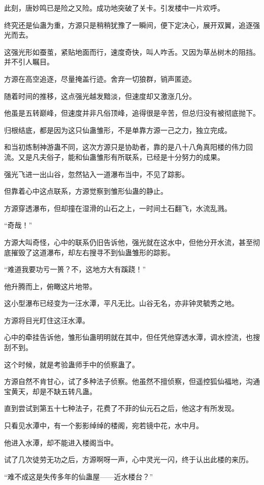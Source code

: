 \begin{this_body}
此刻，唐妙鸣已是险之又险。成功地突破了关卡。引发楼中一片欢呼。

终究还是仙蛊为重，方源只是稍稍犹豫了一瞬间，便下定决心，展开双翼，追逐强光而去。

这强光形如蚕茧，紧贴地面而行，速度奇快，叫人咋舌。又因为草丛树木的阻挡。并不引人瞩目。

方源在高空追逐，尽量掩盖行迹。舍弃一切狼群，销声匿迹。

随着时间的推移，这点强光越发黯淡，但速度却又激涨几分。

他虽是五转巅峰，但速度并非凡俗顶峰，追得很是辛苦，但总归没有被彻底抛下。

归根结底，都是因为这只仙蛊雏形，不是单靠方源一己之力，独立完成。

和当初炼制神游蛊不同，这次方源只是协助者，靠的是八十八角真阳楼的伟力回流。又是凡夫俗子，能和仙蛊雏形有所联系，已经是十分努力的成果。

强光飞进一出山谷，忽然钻入一道瀑布当中，不见了踪影。

但靠着心中这点联系，方源觉察到雏形仙蛊的静止。

方源穿透瀑布，但却撞在湿滑的山石之上，一时间土石翻飞，水流乱溅。

“奇哉！”

方源大叫奇怪，心中的联系仍旧告诉他，强光就在这水中，但他分开水流，甚至彻底摧毁了这道瀑布，却左右搜寻不到仙蛊雏形的踪影。

“难道我要功亏一篑？不，这地方大有蹊跷！”

他升腾而上，俯瞰这片地带。

这小型瀑布已经变为一汪水潭，平凡无比。山谷无名，亦非钟灵毓秀之地。

方源将目光盯住这汪水潭。

心中的牵挂告诉他，雏形仙蛊明明就在其中，但任凭他穿透水潭，调水控流，也搜刮不到。

这个时候，就是考验蛊师手中的侦察蛊了。

方源自然不肯甘心，试了多种法子侦察。他虽然不擅侦察，但遥控狐仙福地，沟通宝黄天，却是不缺五转凡蛊。

直到尝试到第五十七种法子，花费了不菲的仙元石之后，他这才有所发现。

只看见水潭中，有一个影影绰绰的楼阁，宛若镜中花，水中月。

他进入水潭，却不能进入楼阁当中。

试了几次徒劳无功之后，方源啊呀一声，心中灵光一闪，终于认出此楼的来历。

“难不成这是失传多年的仙蛊屋——近水楼台？”


\end{this_body}
